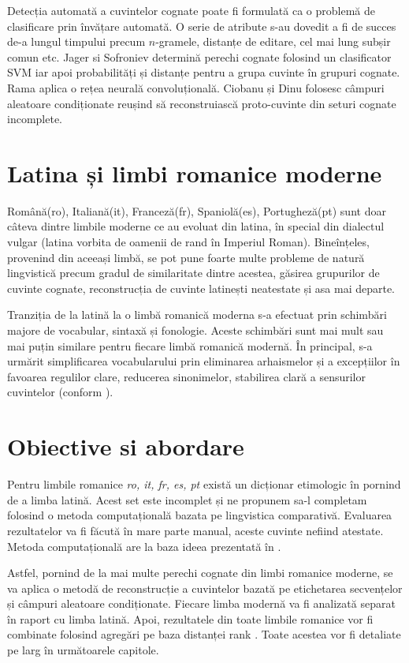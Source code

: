 Detecția automată a cuvintelor cognate poate fi formulată ca o problemă de clasificare prin învățare
automată. O serie de atribute s-au dovedit a fi de succes de-a lungul timpului precum $n$-gramele,
distanțe de editare, cel mai lung subșir comun etc. Jager si Sofroniev \cite{svmclass} determină
perechi cognate folosind un clasificator SVM iar apoi probabilități și distanțe pentru a grupa
cuvinte în grupuri cognate. Rama \cite{cnn} aplica o rețea neurală convoluțională. Ciobanu și Dinu
\cite{theone} folosesc câmpuri aleatoare condiționate reușind să reconstruiască proto-cuvinte din
seturi cognate incomplete.

\section{Latina și limbi romanice moderne}
Română(ro), Italiană(it), Franceză(fr), Spaniolă(es), Portugheză(pt) sunt doar câteva dintre limbile
moderne ce au evoluat din latina, în special din dialectul vulgar (latina vorbita de oamenii de rand 
în Imperiul Roman). Bineînțeles, provenind din aceeași limbă, se pot pune foarte multe probleme de 
natură lingvistică precum gradul de similaritate dintre acestea, găsirea grupurilor de cuvinte cognate,
reconstrucția de cuvinte latinești neatestate și asa mai departe.

Tranziția de la latină la o limbă romanică moderna s-a efectuat prin schimbări majore de vocabular, 
sintaxă și fonologie. Aceste schimbări sunt mai mult sau mai puțin similare pentru fiecare limbă
romanică modernă. În principal, s-a urmărit simplificarea vocabularului prin eliminarea arhaismelor
și a excepțiilor în favoarea regulilor clare, reducerea sinonimelor, stabilirea clară a sensurilor
cuvintelor (conform \cite{sala}).

\section{Obiective si abordare}
Pentru limbile romanice \textit{ro, it, fr, es, pt} există un dicționar etimologic în \cite{ripeanubook}
pornind de a limba latină. Acest set este incomplet și ne propunem sa-l completam folosind o metoda 
computațională bazata pe lingvistica comparativă. Evaluarea rezultatelor va fi făcută în mare parte
manual, aceste cuvinte nefiind atestate. Metoda computațională are la baza ideea prezentată în 
\cite{theone}.

Astfel, pornind de la mai multe perechi cognate din limbi romanice moderne, se va aplica o metodă
de reconstrucție a cuvintelor bazată pe etichetarea secvențelor și câmpuri aleatoare condiționate. 
Fiecare limba modernă va fi analizată separat în raport cu limba latină. Apoi, rezultatele din toate 
limbile romanice vor fi combinate folosind agregări pe baza distanței rank \cite{rankdistance}.
Toate acestea vor fi detaliate pe larg în următoarele capitole.
